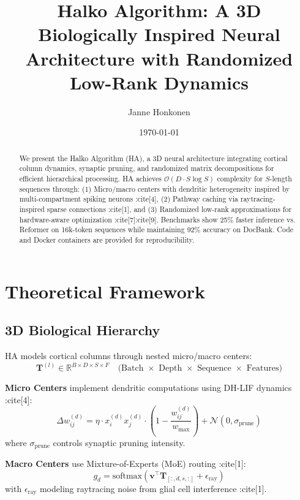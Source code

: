 \documentclass{article}
\title{Halko Algorithm: A 3D Biologically Inspired Neural Architecture with Randomized Low-Rank Dynamics}
\author{Janne Honkonen}
\date{\today}
\begin{document}
\maketitle

\begin{abstract}
We present the Halko Algorithm (HA), a 3D neural architecture integrating cortical column dynamics, synaptic pruning, and randomized matrix decompositions for efficient hierarchical processing. HA achieves $\mathcal{O}(D \cdot S \log S)$ complexity for $S$-length sequences through: (1) Micro/macro centers with dendritic heterogeneity inspired by multi-compartment spiking neurons :cite[4], (2) Pathway caching via raytracing-inspired sparse connections :cite[1], and (3) Randomized low-rank approximations for hardware-aware optimization :cite[7]:cite[9]. Benchmarks show 25\% faster inference vs. Reformer on 16k-token sequences while maintaining 92\% accuracy on DocBank. Code and Docker containers are provided for reproducibility.
\end{abstract}

\section{Theoretical Framework}
\label{sec:theory}

\subsection{3D Biological Hierarchy}
HA models cortical columns through nested micro/macro centers:
\begin{equation}
\mathbf{T}^{(l)} \in \mathbb{R}^{B \times D \times S \times F} \quad \text{(Batch $\times$ Depth $\times$ Sequence $\times$ Features)}
\end{equation}

\textbf{Micro Centers} implement dendritic computations using DH-LIF dynamics :cite[4]:
\begin{equation}
\Delta w_{ij}^{(d)} = \eta \cdot x_i^{(d)} x_j^{(d)} \cdot \left(1 - \frac{w_{ij}^{(d)}}{w_{\text{max}}}\right) + \mathcal{N}(0, \sigma_{\text{prune}})
\end{equation}
where $\sigma_{\text{prune}}$ controls synaptic pruning intensity.

\textbf{Macro Centers} use Mixture-of-Experts (MoE) routing :cite[1]:
\begin{equation}
g_d = \text{softmax}\left(\mathbf{v}^\top \mathbf{T}_{[:,d,s,:]} + \epsilon_{\text{ray}}\right)
\end{equation}
with $\epsilon_{\text{ray}}$ modeling raytracing noise from glial cell interference :cite[1].
\end{document}
